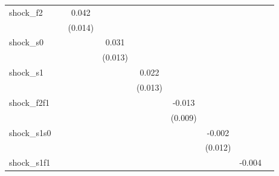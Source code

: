 {\begin{tabular}{l*{8}{c}}
\addlinespace
shock\_f2    &                     &       0.042\sym{***}&                     &                     &                     &                     &                     &                     \\
            &                     &     (0.014)         &                     &                     &                     &                     &                     &                     \\
\addlinespace
shock\_s0    &                     &                     &       0.031\sym{**} &                     &                     &                     &                     &                     \\
            &                     &                     &     (0.013)         &                     &                     &                     &                     &                     \\
\addlinespace
shock\_s1    &                     &                     &                     &       0.022         &                     &                     &                     &                     \\
            &                     &                     &                     &     (0.013)         &                     &                     &                     &                     \\
\addlinespace
shock\_f2f1  &                     &                     &                     &                     &      -0.013         &                     &                     &                     \\
            &                     &                     &                     &                     &     (0.009)         &                     &                     &                     \\
\addlinespace
shock\_s1s0  &                     &                     &                     &                     &                     &      -0.002         &                     &                     \\
            &                     &                     &                     &                     &                     &     (0.012)         &                     &                     \\
\addlinespace
shock\_s1f1  &                     &                     &                     &                     &                     &                     &      -0.004         &                     \\

\end{tabular}}
